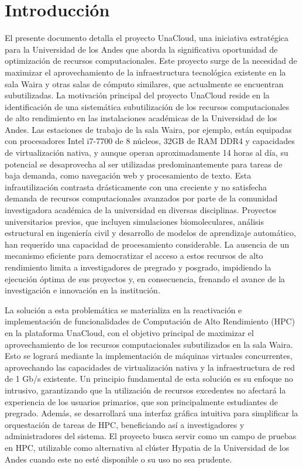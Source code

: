 \section{Introducción}

El presente documento detalla el proyecto UnaCloud, una iniciativa estratégica para la Universidad de los Andes que aborda la significativa oportunidad de optimización de recursos computacionales. Este proyecto surge de la necesidad de maximizar el aprovechamiento de la infraestructura tecnológica existente en la sala Waira y otras salas de cómputo similares, que actualmente se encuentran subutilizadas. La motivación principal del proyecto UnaCloud reside en la identificación de una sistemática subutilización de los recursos computacionales de alto rendimiento en las instalaciones académicas de la Universidad de los Andes. Las estaciones de trabajo de la sala Waira, por ejemplo, están equipadas con procesadores Intel i7-7700 de 8 núcleos, 32GB de RAM DDR4 y capacidades de virtualización nativa, y aunque operan aproximadamente 14 horas al día, su potencial se desaprovecha al ser utilizadas predominantemente para tareas de baja demanda, como navegación web y procesamiento de texto. Esta infrautilización contrasta drásticamente con una creciente y no satisfecha demanda de recursos computacionales avanzados por parte de la comunidad investigadora académica de la universidad en diversas disciplinas. Proyectos universitarios previos, que incluyen simulaciones biomoleculares, análisis estructural en ingeniería civil y desarrollo de modelos de aprendizaje automático, han requerido una capacidad de procesamiento considerable. La ausencia de un mecanismo eficiente para democratizar el acceso a estos recursos de alto rendimiento limita a investigadores de pregrado y posgrado, impidiendo la ejecución óptima de sus proyectos y, en consecuencia, frenando el avance de la investigación e innovación en la institución.

La solución a esta problemática se materializa en la reactivación e implementación de funcionalidades de Computación de Alto Rendimiento (HPC) en la plataforma UnaCloud, con el objetivo principal de maximizar el aprovechamiento de los recursos computacionales subutilizados en la sala Waira. Esto se logrará mediante la implementación de máquinas virtuales concurrentes, aprovechando las capacidades de virtualización nativa y la infraestructura de red de 1 Gb/s existente. Un principio fundamental de esta solución es su enfoque no intrusivo, garantizando que la utilización de recursos excedentes no afectará la experiencia de los usuarios primarios, que son principalmente estudiantes de pregrado. Además, se desarrollará una interfaz gráfica intuitiva para simplificar la orquestación de tareas de HPC, beneficiando así a investigadores y administradores del sistema. El proyecto busca servir como un campo de pruebas en HPC, utilizable como alternativa al clúster Hypatia de la Universidad de los Andes cuando este no esté disponible o su uso no sea prudente.

